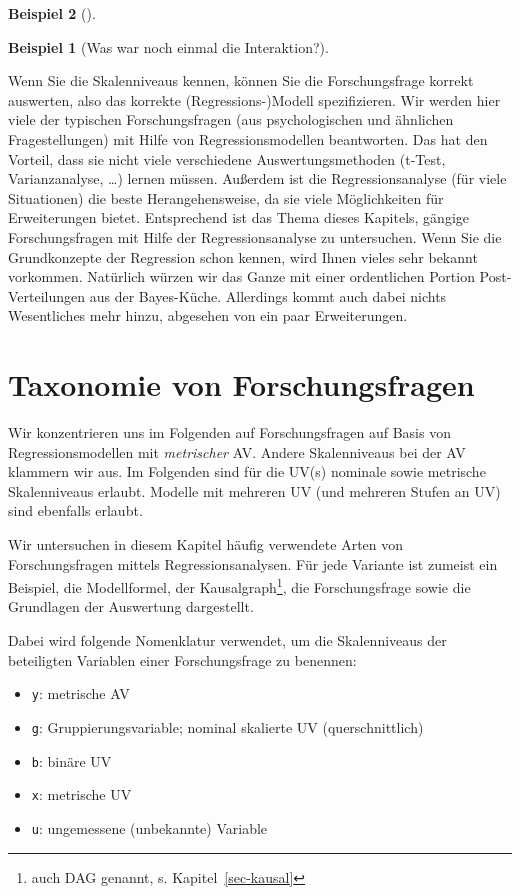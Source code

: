 \documentclass[
  ngerman,
  letterpaper,
  twoside,
  open=any]{scrbook}
\providecommand{\tightlist}{%
  \setlength{\itemsep}{0pt}\setlength{\parskip}{0pt}}\usepackage{longtable,booktabs,array}
\theoremstyle{definition}
\newtheorem{example}{Beispiel}[chapter]
\theoremstyle{plain}
\theoremstyle{definition}
\theoremstyle{definition}
\theoremstyle{remark}
\begin{document}
\begin{example}[]
\begin{example}[Was war noch einmal die
Interaktion?]
\end{example}

Wenn Sie die Skalenniveaus kennen, können Sie die Forschungsfrage
korrekt auswerten, also das korrekte (Regressions-)Modell spezifizieren.
Wir werden hier viele der typischen Forschungsfragen (aus
psychologischen und ähnlichen Fragestellungen) mit Hilfe von
Regressionsmodellen beantworten. Das hat den Vorteil, dass sie nicht
viele verschiedene Auswertungsmethoden (t-Test, Varianzanalyse, \ldots)
lernen müssen. Außerdem ist die Regressionsanalyse (für viele
Situationen) die beste Herangehensweise, da sie viele Möglichkeiten für
Erweiterungen bietet. Entsprechend ist das Thema dieses Kapitels,
gängige Forschungsfragen mit Hilfe der Regressionsanalyse zu
untersuchen. Wenn Sie die Grundkonzepte der Regression schon kennen,
wird Ihnen vieles sehr bekannt vorkommen. Natürlich würzen wir das Ganze
mit einer ordentlichen Portion Post-Verteilungen aus der Bayes-Küche.
Allerdings kommt auch dabei nichts Wesentliches mehr hinzu, abgesehen
von ein paar Erweiterungen.

\section{Taxonomie von
Forschungsfragen}\label{taxonomie-von-forschungsfragen}

Wir konzentrieren uns im Folgenden auf Forschungsfragen auf Basis von
Regressionsmodellen mit \emph{metrischer} AV. Andere Skalenniveaus bei
der AV klammern wir aus. Im Folgenden sind für die UV(s) nominale sowie
metrische Skalenniveaus erlaubt. Modelle mit mehreren UV (und mehreren
Stufen an UV) sind ebenfalls erlaubt.

Wir untersuchen in diesem Kapitel häufig verwendete Arten von
Forschungsfragen mittels Regressionsanalysen. Für jede Variante ist
zumeist ein Beispiel, die Modellformel, der Kausalgraph\footnote{auch
  DAG genannt, s. Kapitel~\ref{sec-kausal}}, die Forschungsfrage sowie
die Grundlagen der Auswertung dargestellt.

Dabei wird folgende Nomenklatur verwendet, um die Skalenniveaus der
beteiligten Variablen einer Forschungsfrage zu benennen:

\begin{itemize}
\tightlist
\item
  \texttt{y}: metrische AV
\item
  \texttt{g}: Gruppierungsvariable; nominal skalierte UV
  (querschnittlich)
\item
  \texttt{b}: binäre UV
\item
  \texttt{x}: metrische UV
\item
  \texttt{u}: ungemessene (unbekannte) Variable
\end{itemize}


\end{example}
\end{document}
